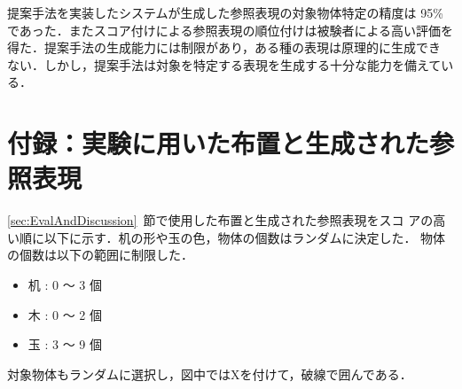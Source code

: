 \documentclass[japanese]{jnlp_1.2}
\begin{document}
提案手法を実装したシステムが生成した参照表現の対象物体特定の精度は
95\%であった．またスコア付けによる参照表現の順位付けは被験者による高い評価を
得た．提案手法の生成能力には制限があり，ある種の表現は原理的に生成でき
ない．しかし，提案手法は対象を特定する表現を生成する十分な能力を備えてい
る．




\appendix

\section*{付録：実験に用いた布置と生成された参照表現}\label{App:A}

\ref{sec:EvalAndDiscussion}~節で使用した布置と生成された参照表現をスコ
アの高い順に以下に示す．机の形や玉の色，物体の個数はランダムに決定した．
物体の個数は以下の範囲に制限した．
\begin{itemize}
\item 机 :  0 〜 3 個
\item 木 :  0 〜 2 個
\item 玉 :  3 〜 9 個
\end{itemize}
対象物体もランダムに選択し，図中ではXを付けて，破線で囲んである．


\def\arrangement#1#2{}
\end{document}
